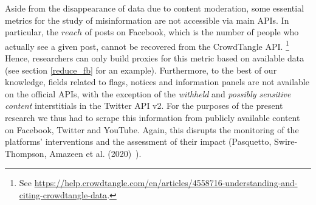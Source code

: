 \documentclass{article}
\begin{document}
Aside from the disappearance of data due to content moderation, some essential metrics for the study of misinformation are not accessible via main APIs. 
In particular, the $reach$ of posts on Facebook, which is the number of people who actually see a given post, cannot be recovered from the CrowdTangle API.
\footnote{See \href{https://help.crowdtangle.com/en/articles/4558716-understanding-and-citing-crowdtangle-data}{https://help.crowdtangle.com/en/articles/4558716-understanding-and-citing-crowdtangle-data}.} 
Hence, researchers can only build proxies for this metric based on available data (see section \ref{reduce_fb} for an example). 
Furthermore, to the best of our knowledge, fields related to flags, notices and information panels are not available on the official APIs, with the exception of the {\it withheld}  and {\it possibly sensitive content} interstitials in the Twitter API v2. 
For the purposes of the present research we thus had to scrape this information from publicly available content on Facebook, Twitter and YouTube. 
Again, this disrupts the monitoring of the platforms' interventions and the assessment of their impact (Pasquetto, Swire-Thompson, Amazeen et al. (2020)~\cite{pasquetto}).

\smallskip
\end{document}
